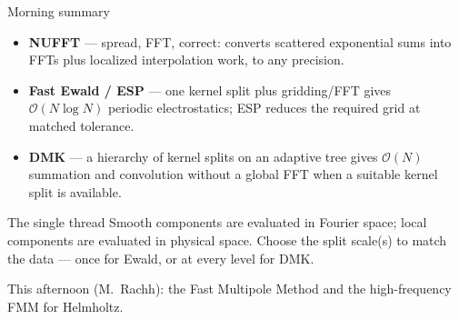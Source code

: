 \documentclass[aspectratio=169,11pt]{beamer}
\newcommand{\cO}{\mathcal{O}}
\newcommand{\gray}[1]{{\color{mygray}#1}}
\begin{document}
\begin{frame}{Morning summary}
\small
\begin{itemize}
  \item \textbf{NUFFT} --- spread, FFT, correct: converts scattered exponential
  sums into FFTs plus localized interpolation work, to any precision.
  \item \textbf{Fast Ewald / ESP} --- one kernel split plus gridding/FFT gives \(\cO(N\log N)\) periodic electrostatics; ESP reduces the required grid at matched tolerance.
  \item \textbf{DMK} --- a hierarchy of kernel splits on an adaptive tree gives \(\cO(N)\) summation and convolution without a global FFT when a suitable kernel split is available.
\end{itemize}
\vspace{2mm}
\begin{block}{The single thread}
Smooth components are evaluated in Fourier space; local components are evaluated in physical space. Choose the split scale(s) to match the data --- once for Ewald, or at every level for DMK.
\end{block}
\vspace{2mm}
\centerline{\gray{This afternoon (M.\ Rachh): the Fast Multipole Method and the high-frequency FMM for Helmholtz.}}
\end{frame}
\end{document}
